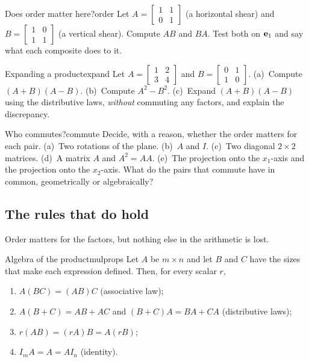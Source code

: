 \documentclass[11pt]{article}
\begin{document}
\begin{kc}{Does order matter here?}{order}
Let $A=\begin{bmatrix}1&1\\0&1\end{bmatrix}$ (a horizontal shear) and $B=\begin{bmatrix}1&0\\1&1\end{bmatrix}$ (a vertical shear). Compute $AB$ and $BA$. Test both on $\mathbf{e}_1$ and say what each composite does to it.
\end{kc}

\begin{kc}{Expanding a product}{expand}
Let $A=\begin{bmatrix}1&2\\3&4\end{bmatrix}$ and $B=\begin{bmatrix}0&1\\1&0\end{bmatrix}$. (a)~Compute $(A+B)(A-B)$. (b)~Compute $A^2-B^2$. (c)~Expand $(A+B)(A-B)$ using the distributive laws, \emph{without} commuting any factors, and explain the discrepancy.
\end{kc}

\begin{think}{Who commutes?}{commute}
Decide, with a reason, whether the order matters for each pair. (a)~Two rotations of the plane. (b)~$A$ and $I$. (c)~Two diagonal $2\times2$ matrices. (d)~A matrix $A$ and $A^2=AA$. (e)~The projection onto the $x_1$-axis and the projection onto the $x_2$-axis. What do the pairs that commute have in common, geometrically or algebraically?
\end{think}

\subsection*{The rules that do hold}

Order matters for the factors, but nothing else in the arithmetic is lost.

\begin{thm}{Algebra of the product}{mulprops}
Let $A$ be $m\times n$ and let $B$ and $C$ have the sizes that make each expression defined. Then, for every scalar $r$,
\begin{enumerate}[label=(\alph*),itemsep=1pt]
  \item $A(BC)=(AB)C$ \quad (associative law);
  \item $A(B+C)=AB+AC$ \quad and \quad $(B+C)A=BA+CA$ \quad (distributive laws);
  \item $r(AB)=(rA)B=A(rB)$;
  \item $I_mA=A=AI_n$ \quad (identity).
\end{enumerate}
\end{thm}
\end{document}

